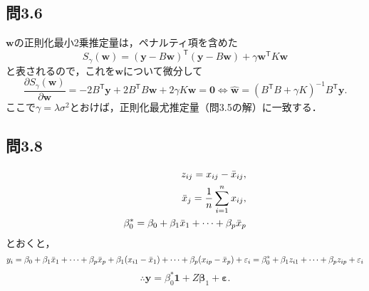 \documentclass[pdflatex,ja=standard]{bxjsarticle}
\begin{document}
\subsection*{問3.6}
$\bm{w}$の正則化最小2乗推定量は，ペナルティ項を含めた
\begin{equation}
S_{\gamma} (\bm{w}) = (\bm{y} - B \bm{w})^{\mathsf{T}} (\bm{y} - B \bm{w}) + \gamma \bm{w}^{\mathsf{T}} K \bm{w}
\end{equation}
と表されるので，これを$\bm{w}$について微分して
\begin{equation}
\frac{\partial S_{\gamma} (\bm{w}) }{\partial \bm{w}} = -2 B^{\mathsf{T}} \bm{y} + 2 B^{\mathsf{T}} B \bm{w} + 2 \gamma K \bm{w} = \bm{0}
\iff \hat{\bm{w}} = (B^{\mathsf{T}} B + \gamma K)^{-1} B^{\mathsf{T}} \bm{y}.
\end{equation}
ここで$\gamma = \lambda \sigma^2$とおけば，正則化最尤推定量（問3.5の解）に一致する．

\subsection*{問3.8}
\begin{eqnarray}
z_{ij} = x_{ij} - \Bar{x}_{ij}, \\
\Bar{x}_j = \frac{1}{n} \sum_{i=1}^{n} x_{ij}, \\
\beta^{*}_0 = \beta_0 + \beta_1 \Bar{x}_1 + \cdots + \beta_p \Bar{x}_p 
\end{eqnarray}
とおくと，
\begin{equation}
y_i = \beta_0 + \beta_1 \Bar{x}_1 + \cdots + \beta_p \Bar{x}_p + \beta_1 (x_{i1} - \Bar{x}_1) + \cdots + \beta_p (x_{ip} - \Bar{x}_p) + \varepsilon_i \\
= \beta^{*}_0 + \beta_1 z_{i1} + \cdots + \beta_p z_{ip} + \varepsilon_i
\end{equation}
\begin{equation}
\therefore \bm{y} = \beta^{*}_0 \bm{1} + Z \bm{\beta}_{1} + \bm{\varepsilon}.
\end{equation}
\end{document}
